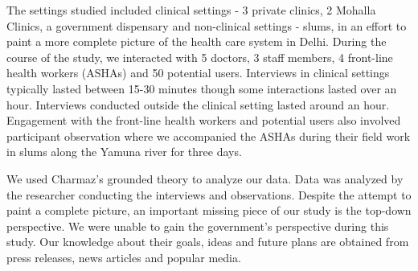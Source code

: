 The settings studied included clinical settings - 3 private clinics, 2 Mohalla Clinics, a government dispensary and non-clinical settings - slums, in an effort to paint a more complete picture of the health care system in Delhi. During the course of the study, we interacted with 5 doctors, 3 staff members, 4 front-line health workers (ASHAs) and 50 potential users. Interviews in clinical settings typically lasted between 15-30 minutes though some interactions lasted over an hour. Interviews conducted outside the clinical setting lasted around an hour. Engagement with the front-line health workers and potential users also involved participant observation where we accompanied the ASHAs during their field work in slums along the Yamuna river for three days.

We used Charmaz's grounded theory to analyze our data. Data was analyzed by the researcher conducting the interviews and observations. Despite the attempt to paint a complete picture, an important missing piece of our study is the top-down perspective. We were unable to gain the government's perspective during this study. Our knowledge about their goals, ideas and future plans are obtained from press releases, news articles and popular media. %